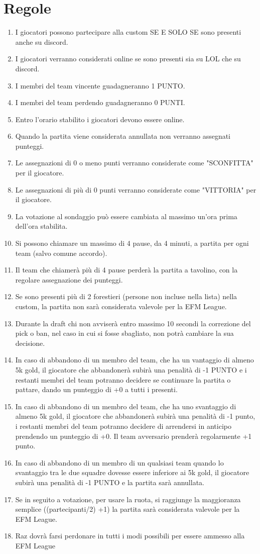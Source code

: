 \documentclass[a4paper, 12pt]{report}
\begin{document}
\section*{Regole}
\begin{enumerate}
  \item I giocatori possono partecipare alla custom SE E SOLO SE sono presenti anche su discord.
  \item I giocatori verranno considerati online se sono presenti sia su LOL che su discord.
  \item I membri del team vincente guadagneranno 1 PUNTO.
  \item I membri del team perdendo guadagneranno 0 PUNTI.
  \item Entro l'orario stabilito i giocatori devono essere online.
  \item Quando la partita viene considerata annullata non verranno assegnati punteggi.
  \item Le assegnazioni di 0 o meno punti verranno considerate come "SCONFITTA" per il giocatore.
  \item Le assegnazioni di più di 0 punti verranno considerate come "VITTORIA" per il giocatore.
  \item La votazione al sondaggio può essere cambiata al massimo un'ora prima dell'ora stabilita.
  \item Si possono chiamare un massimo di 4 pause, da 4 minuti, a partita per ogni team (salvo comune accordo).
  \item Il team che chiamerà più di 4 pause perderà la partita a tavolino, con la regolare assegnazione dei punteggi.
  \item Se sono presenti più di 2 forestieri (persone non incluse nella lista) nella custom, la partita non sarà considerata valevole per la EFM League.
  \item Durante la draft chi non avviserà entro massimo 10 secondi la correzione del pick o ban, nel caso in cui si fosse sbagliato, non potrà cambiare la sua decisione.
  \item In caso di abbandono di un membro del team, che ha un vantaggio di almeno 5k gold, il giocatore che abbandonerà subirà una penalità di -1 PUNTO e i restanti membri del team potranno decidere se continuare la partita o pattare, dando un punteggio di +0 a tutti i presenti.
  \item In caso di abbandono di un membro del team, che ha uno svantaggio di almeno 5k gold, il giocatore che abbandonerà subirà una penalità di -1 punto, i restanti membri del team potranno decidere di arrendersi in anticipo prendendo un punteggio di +0. Il team avversario prenderà regolarmente +1 punto.
  \item In caso di abbandono di un membro di un qualsiasi team quando lo svantaggio tra le due squadre dovesse essere inferiore ai 5k gold, il giocatore subirà una penalità di -1 PUNTO e la partita sarà annullata.
  \item Se in seguito a votazione, per usare la ruota, si raggiunge la maggioranza semplice ((partecipanti/2) +1) la partita sarà considerata valevole per la EFM League.
  \item Raz dovrà farsi perdonare in tutti i modi possibili per essere ammesso alla EFM League
\end{enumerate}
\end{document}
